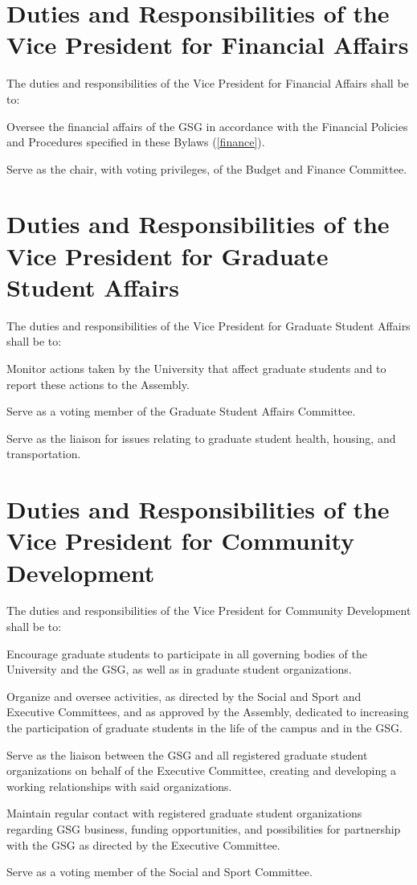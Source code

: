 \section{Duties and Responsibilities of the Vice President for Financial Affairs}
The duties and responsibilities of the Vice President for Financial Affairs shall be to:
\begin{bylaws-number}
  \item Oversee the financial affairs of the GSG in accordance with the Financial Policies and Procedures specified in these Bylaws (\chaptername \ref{finance}).
  \item Serve as the chair, with voting privileges, of the Budget and Finance Committee.
\end{bylaws-number}

\section{Duties and Responsibilities of the Vice President for Graduate Student Affairs}
The duties and responsibilities of the Vice President for Graduate Student Affairs shall be to:
\begin{bylaws-number}
  \item Monitor actions taken by the University that affect graduate students and to report these actions to the Assembly.
  \item Serve as a voting member of the Graduate Student Affairs Committee.
  \item Serve as the liaison for issues relating to graduate student health, housing, and transportation.
\end{bylaws-number}

\section{Duties and Responsibilities of the Vice President for Community Development}
The duties and responsibilities of the Vice President for Community Development shall be to:
\begin{bylaws-number}
  \item Encourage graduate students to participate in all governing bodies of the University and the GSG, as well as in graduate student organizations.
  \item Organize and oversee activities, as directed by the Social and Sport and Executive Committees, and as approved by the Assembly, dedicated to increasing the participation of graduate students in the life of the campus and in the GSG.
  \item Serve as the liaison between the GSG and all registered graduate student organizations on behalf of the Executive Committee, creating and developing a working relationships with said organizations.
  \item Maintain regular contact with registered graduate student organizations regarding GSG business, funding opportunities, and possibilities for partnership with the GSG as directed by the Executive Committee.
  \item Serve as a voting member of the Social and Sport Committee.
\end{bylaws-number}

